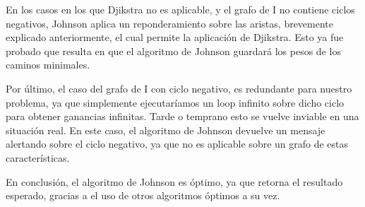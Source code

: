 \documentclass[../tp2_grupo404.tex]{subfiles}
\begin{document}
En los casos en los que Djikstra no es aplicable, y el grafo de I no contiene ciclos negativos, Johnson
aplica un reponderamiento sobre las aristas, brevemente explicado anteriormente, el cual permite la aplicación
de Djikstra. Esto ya fue probado que resulta en que el algoritmo de Johnson guardará los pesos de los caminos
minimales.

Por último, el caso del grafo de I con ciclo negativo, es redundante para nuestro problema, ya que simplemente
ejecutaríamos un loop infinito sobre dicho ciclo para obtener ganancias infinitas. Tarde o temprano esto se
vuelve inviable en una situación real. En este caso, el algoritmo de Johnson devuelve un mensaje alertando
sobre el ciclo negativo, ya que no es aplicable sobre un grafo de estas características.

En conclusión, el algoritmo de Johnson es óptimo, ya que retorna el resultado esperado, gracias a el uso de
otros algoritmos óptimos a su vez.

\end{document}
